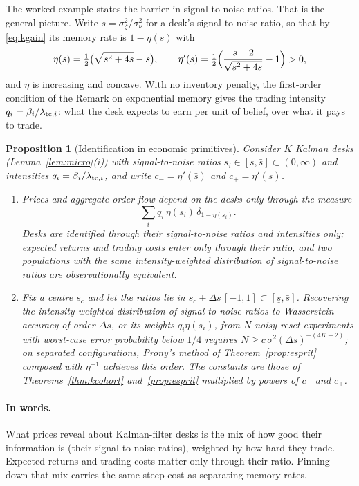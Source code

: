 \documentclass[12pt]{article}
\newtheorem{proposition}[theorem]{Proposition}
\theoremstyle{definition}
\theoremstyle{remark}
\begin{document}
The worked example states the barrier in signal-to-noise ratios. That is the general picture. Write $s=\sigma_\zeta^2/\sigma_\nu^2$ for a desk's signal-to-noise ratio, so that by \eqref{eq:kgain} its memory rate is $1-\eta(s)$ with
\[
\eta(s)=\tfrac12\bigl(\sqrt{s^2+4s}-s\bigr),\qquad \eta'(s)=\tfrac12\Bigl(\frac{s+2}{\sqrt{s^2+4s}}-1\Bigr)>0 ,
\]
and $\eta$ is increasing and concave. With no inventory penalty, the first-order condition of the Remark on exponential memory gives the trading intensity $q_i=\beta_i/\lambda_{{\rm tc},i}$: what the desk expects to earn per unit of belief, over what it pays to trade.

\begin{proposition}[Identification in economic primitives]\label{prop:primitives}
Consider $K$ Kalman desks (Lemma~\ref{lem:micro}(i)) with signal-to-noise ratios $s_i\in[\underline s,\bar s]\subset(0,\infty)$ and intensities $q_i=\beta_i/\lambda_{{\rm tc},i}$, and write $c_-=\eta'(\bar s)$ and $c_+=\eta'(\underline s)$.
\begin{enumerate}[label=(\roman*)]
\item Prices and aggregate order flow depend on the desks only through the measure
\[
\sum_iq_i\,\eta(s_i)\,\delta_{1-\eta(s_i)}.
\]
Desks are identified through their signal-to-noise ratios and intensities only; expected returns and trading costs enter only through their ratio, and two populations with the same intensity-weighted distribution of signal-to-noise ratios are observationally equivalent.
\item Fix a centre $s_c$ and let the ratios lie in $s_c+\Delta s\,[-1,1]\subset[\underline s,\bar s]$. Recovering the intensity-weighted distribution of signal-to-noise ratios to Wasserstein accuracy of order $\Delta s$, or its weights $q_i\eta(s_i)$, from $N$ noisy reset experiments with worst-case error probability below $1/4$ requires $N\ge c\,\sigma^2(\Delta s)^{-(4K-2)}$; on separated configurations, Prony's method of Theorem~\ref{prop:esprit} composed with $\eta^{-1}$ achieves this order. The constants are those of Theorems~\ref{thm:kcohort} and~\ref{prop:esprit} multiplied by powers of $c_-$ and $c_+$.
\end{enumerate}
\end{proposition}

\paragraph{In words.} What prices reveal about Kalman-filter desks is the mix of how good their information is (their signal-to-noise ratios), weighted by how hard they trade. Expected returns and trading costs matter only through their ratio. Pinning down that mix carries the same steep cost as separating memory rates.
\end{document}
